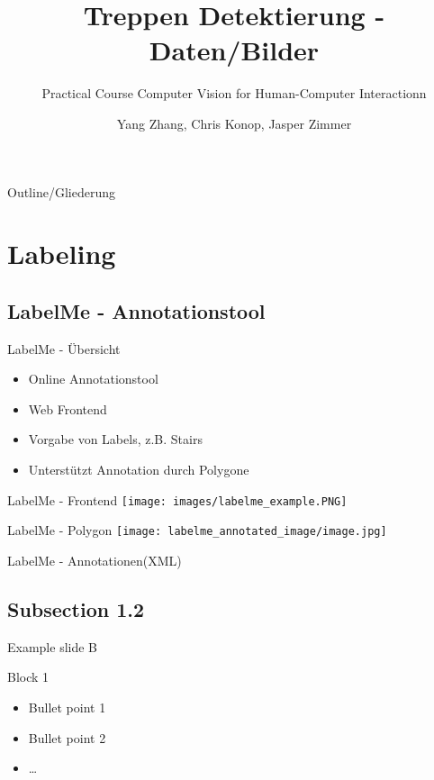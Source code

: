 \documentclass[18pt]{beamer}
\title[Daten/Bilder]{Treppen Detektierung - Daten/Bilder}
\subtitle{Practical Course Computer Vision for Human-Computer Interactionn}
\author{Yang Zhang, Chris Konop, Jasper Zimmer}
\institute{Computer Vision for Human-Computer Interaction Lab}
\begin{document}

\begin{frame}
\titlepage
\end{frame}

\begin{frame}{Outline/Gliederung}
\tableofcontents
\end{frame}

\section{Labeling}
\subsection{LabelMe - Annotationstool}
\begin{frame}{LabelMe - Übersicht}
\begin{itemize}
\item Online Annotationstool
\item Web Frontend
\item Vorgabe von Labels, z.B. Stairs
\item Unterstützt Annotation durch Polygone
\end{itemize}
\end{frame}

\begin{frame}{LabelMe - Frontend}
\texttt{[image: images/labelme\_example.PNG]}
\end{frame}

\begin{frame}{LabelMe - Polygon}
\texttt{[image: labelme\_annotated\_image/image.jpg]}
\end{frame}

\begin{frame}{LabelMe - Annotationen(XML)}

\end{frame}

\subsection{Subsection 1.2}
\begin{frame}{Example slide B}
\begin{block}{Block 1}
\begin{itemize}
\item Bullet point 1
\pause
\item Bullet point 2
\item \dots
\end{itemize}
\end{block}
\end{frame}
\end{document}
